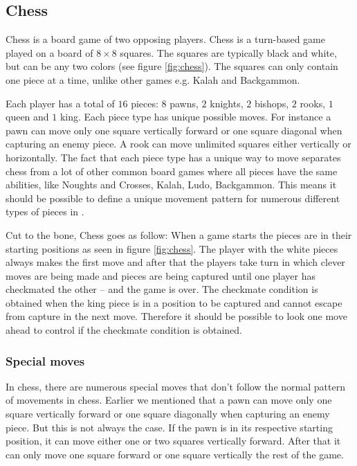 \subsection{Chess}
Chess is a board game of two opposing players. Chess is a turn-based game played
on a board of $8 \times 8$ squares. The squares are typically black and white,
but can be any two colors (see figure \ref{fig:chess}). The squares can only
contain one piece at a time, unlike other games e.g. Kalah and Backgammon. 

Each player has a total of $16$ pieces: $8$ pawns, $2$ knights, $2$
bishops, $2$ rooks, $1$ queen and $1$ king. Each piece type has unique
possible moves. For instance a pawn can move only one square vertically
forward or one square diagonal when capturing an enemy piece. A rook
can move unlimited squares either vertically or horizontally. The fact
that each piece type has a unique way to move separates chess from a lot
of other common board games where all pieces have the same abilities,
like Noughts and Crosses, Kalah, Ludo, Backgammon. This means it should
be possible to define a unique movement pattern for numerous different
types of pieces in \productname{}.

Cut to the bone, Chess goes as follow: When a game starts the pieces are in their
starting positions as seen in figure \ref{fig:chess}. The player with the white
pieces always makes the first move and after that the players take turn in
which clever moves are being made and pieces are being captured until one
player has checkmated the other -- and the game is over. The checkmate condition
is obtained when the king piece is in a position to be captured and cannot
escape from capture in the next move. \cite{chessrules} Therefore it should be
possible to look one move ahead to control if the checkmate condition is
obtained.

\subsubsection{Special moves} 
In chess, there are numerous special moves that don't follow the normal pattern
of movements in chess. Earlier we mentioned that a pawn can move only one square
vertically forward or one square diagonally when capturing an enemy piece. But
this is not always the case. If the pawn is in its respective starting position, it
can move either one or two squares vertically forward. After that it can only
move one square forward or one square vertically the rest of the game. 

